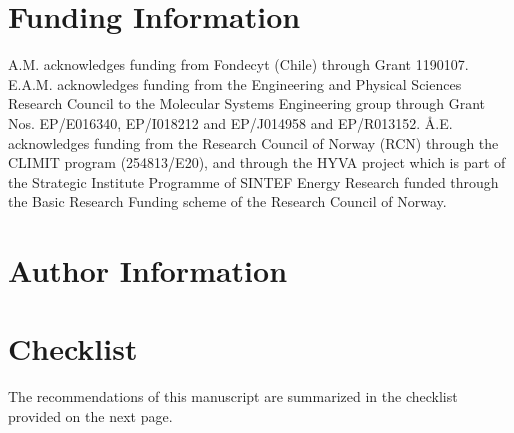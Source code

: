 \documentclass[9pt,bestpractices]{livecoms}
\begin{document}
\section{Funding Information}
A.M. acknowledges funding from Fondecyt (Chile) through Grant 1190107. E.A.M.
acknowledges funding from the Engineering and Physical Sciences Research
Council to the Molecular Systems Engineering group through Grant Nos.
EP/E016340, EP/I018212 and EP/J014958 and EP/R013152.
\AA{}.E. acknowledges funding from the Research Council of Norway (RCN) 
through the CLIMIT program (254813/E20), and through the HYVA project which 
is part of the Strategic Institute Programme of SINTEF Energy Research funded 
through the Basic Research Funding scheme of the Research Council of Norway.

\section*{Author Information}
\makeorcid
\section{Checklist}
\label{checklist}
The recommendations of this manuscript are summarized in the checklist provided on the next page.
\end{document}
